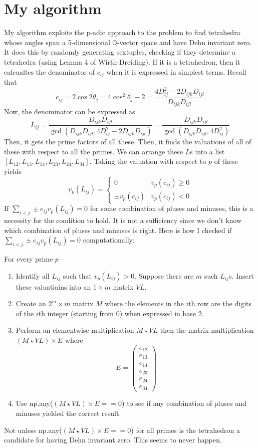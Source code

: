 \documentclass[12pt,reqno]{amsart}
\newcommand{\Q}{\mathbb{Q}}
\theoremstyle{definition}
\theoremstyle{remark}
\begin{document}
\section{My algorithm}
My algorithm exploits the p-adic approach to the problem to find tetrahedra
whose angles span a 5-dimensional $\Q$-vector space and have Dehn invariant zero. 
It does this by randomly generating sextuples, checking if they determine a 
tetrahedra (using Lemma 4 of Wirth-Dreiding). If it is a tetrahedron, then it calcualtes the denominator
of $c_{ij}$ when it is expressed in simplest terms. Recall that
$$
c_{ij}=2\cos2\theta_j=4\cos^2\theta_j-2=\frac{4D_{ij}^2-2D_{ijk}D_{ijl}}{D_{ijk}D_{ijl}}
$$
Now, the denominator can be expressed as 
$$
L_{ij}=\frac{D_{ijk}D_{ijl}}{\gcd(D_{ijk}D_{ijl},4D_{ij}^2-2D_{ijk}D_{ijl})}=
\frac{D_{ijk}D_{ijl}}{\gcd(D_{ijk}D_{ijl},4D_{ij}^2)}
$$
Then, it gets the prime factors of all these. Then, it
finds the valuations of all of these with respect to all the primes. We
can arrange these $L$s into a list $[L_{12},L_{13},L_{14},L_{23},L_{24},L_{34}]$.
Taking the valuation with respect to $p$ of these yields
$$
v_p(L_{ij})=\begin{cases}
  0&v_p(c_{ij})\geq 0\\
  \pm v_p(c_{ij})&v_p(c_{ij})<0
\end{cases}
$$
If $\sum_{i<j}\pm e_{ij}v_p(L_{ij})=0$ for some combination of pluses and minuses,
this is a necessity for the condition to hold. It is not a sufficiency since we don't know
which combination of pluses and minuses is right. Here is how I checked if 
$\sum_{i<j}\pm e_{ij}v_p(L_{ij})=0$ computationally:

For every prime $p$
\begin{enumerate}
  \item Identify all $L_{ij}$ such that $v_p(L_{ij})>0$. Suppose there are $m$ such 
  $L_{ij}$s. Insert these valuatioins into an $1\times m$ matrix $VL$. 
  \item Create an $2^m\times m$ matrix $M$ where the elements in the $i$th row
  are the digits of the $i$th integer (starting from 0) when expressed in base 2.
  \item Perform an elementwise multiplication $M\star VL$ then the matrix
  multiplication $(M\star VL)\times E$ where
  $$
  E=\begin{pmatrix}
    e_{12}\\e_{13}\\e_{14}\\e_{23}\\e_{24}\\e_{34}
  \end{pmatrix}
  $$
  \item Use np.any($(M\star VL)\times E==0$) to see if any combination
  of pluses and minuses yielded the correct result.
\end{enumerate}
Not unless np.any($(M\star VL)\times E==0$) for all primes is the tetrahedron a candidate
for having Dehn invariant zero. This seems to never happen.
\end{document}
